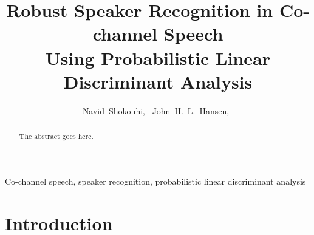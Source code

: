 \documentclass[journal]{IEEEtran}
\begin{document}
\title{Robust Speaker Recognition in Co-channel Speech \\
		Using Probabilistic Linear Discriminant Analysis}
%
%
%

\author{Navid~Shokouhi,~
	John~H.~L.~Hansen,~}

\maketitle


\begin{abstract}
The abstract goes here.
\end{abstract}

\begin{IEEEkeywords}
Co-channel speech, speaker recognition, probabilistic linear discriminant analysis
\end{IEEEkeywords}






%
\IEEEpeerreviewmaketitle



\section{Introduction}
\label{sec:introduction}
\end{document}
